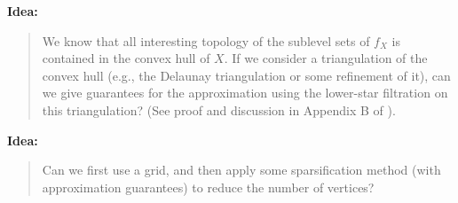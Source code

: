 \documentclass[10pt,a4paper]{article}
\theoremstyle{definition}
\newenvironment{idea}{%
	\begin{tcolorbox}[colback=green, breakable, sharp corners]
		\textbf{Idea: }
		\medskip
		\begin{quote}
			\centering
}{\end{quote}\medskip\end{tcolorbox}}
\begin{document}
\begin{idea}
	We know that all interesting topology of the sublevel sets of $f_X$ is contained in the convex hull of $X$. If we consider a triangulation of the convex hull (e.g., the Delaunay triangulation or some refinement of it), can we give guarantees for the approximation using the lower-star filtration on this triangulation? (See proof and discussion in Appendix B of \autocite{Hoefgeest2022}).
\end{idea}

\begin{idea}
	Can we first use a grid, and then apply some sparsification method (with approximation guarantees) to reduce the number of vertices?
\end{idea}

\printbibliography
\end{document}
